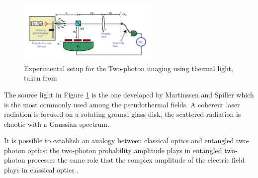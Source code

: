 \begin{figure}[h!]
\centering
\includegraphics[width=0.6\textwidth]{Figures/thermalSetup.png}
\caption{Experimental setup for the Two-photon imaging using thermal light, taken from \cite{thermalAlejandra}} 
\label{fig:thermalSetup}
\end{figure}
The source light in Figure \ref{fig:thermalSetup} is the one developed by Martinssen and Spiller\cite{intensity}
which is the most commonly used among the pseudothermal fields.
A  coherent laser radiation is focused on a rotating ground glass disk, 
the scattered radiation is chaotic with a Gaussian spectrum.




It is possible to establish an analogy
between classical optics and entangled two-photon optics:
the two-photon probability amplitude plays in entangled
two-photon processes the same role that the complex amplitude
of the electric field plays in classical optics  \cite{thermalAlejandra}.